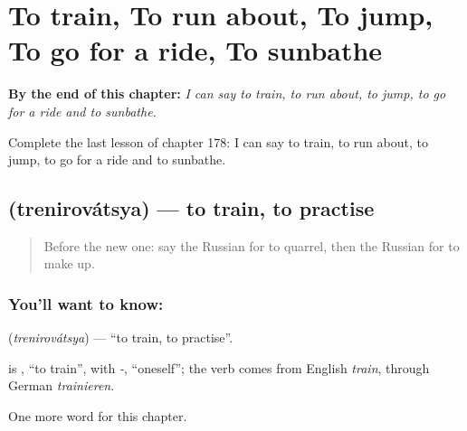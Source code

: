 
\chapter{To train, To run about, To jump, To go for a ride, To sunbathe}
\label{ch:ru-to-train-to-run-about-to-jump-to-go-for-a-ride-to-sunbathe}

\begin{chapteropening}
\textbf{By the end of this chapter:} \emph{I can say to train, to run about, to jump, to go for a ride and to sunbathe.}

Complete the last lesson of chapter 178: I can say to train, to run about, to jump, to go for a ride and to sunbathe.
\end{chapteropening}

\section[\texorpdfstring{\ru{тренироваться} (trenirovátsya)}{тренироваться (trenirovátsya)}]{ (trenirovátsya) — to train, to practise}

\label{lesson:RU-C178-trenirovatsya}



\begin{quote}
Before the new one: say the Russian for to quarrel, then the Russian for to make up.
\end{quote}

\subsection*{You'll want to know: }
\textbf{} (\emph{trenirovátsya}) — \textquotedblleft{}to train, to practise\textquotedblright{}.

\begin{cousinweb}
\textbf{} is \emph{}, \textquotedblleft{}to train\textquotedblright{}, with \emph{-}, \textquotedblleft{}oneself\textquotedblright{}; the verb comes from English \emph{train}, through German \emph{trainieren}.
\end{cousinweb}

\begin{grammarlens}[title={What you've built}]
One more word for this chapter.
\end{grammarlens}

